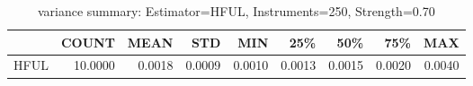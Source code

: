 \begin{table}[ht]
\centering
\caption{variance summary: Estimator=HFUL, Instruments=250, Strength=0.70}
\begin{tabular}{lrrrrrrrr}
\toprule
 & COUNT & MEAN & STD & MIN & 25\% & 50\% & 75\% & MAX \\
\midrule
HFUL & 10.0000 & 0.0018 & 0.0009 & 0.0010 & 0.0013 & 0.0015 & 0.0020 & 0.0040 \\
\bottomrule
\end{tabular}
\end{table}
